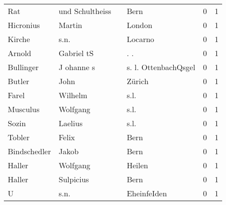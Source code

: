 \begin{center}
\begin{tiny}
\begin{longtabu}{llllrr}
                      Rat &                    und Schultheiss &             &                                        Bern &          0 &         1 \\
                Hicronius &                             Martin &             &                                      London &          0 &         1 \\
                   Kirche &                               s.n. &             &                                     Locarno &          0 &         1 \\
                   Arnold &                         Gabriel tS &             &                                        . .  &          0 &         1 \\
                Bullinger &                         J ohanne s &             &                        s. l. OttenbachQsgel &          0 &         1 \\
                   Butler &                               John &             &                                      Zürich &          0 &         1 \\
                    Farel &                            Wilhelm &             &                                        s.l. &          0 &         1 \\
                 Musculus &                           Wolfgang &             &                                        s.l. &          0 &         1 \\
                    Sozin &                            Laelius &             &                                        s.l. &          0 &         1 \\
                   Tobler &                              Felix &             &                                        Bern &          0 &         1 \\
             Bindschedler &                              Jakob &             &                                        Bern &          0 &         1 \\
                   Haller &                           Wolfgang &             &                                      Heilen &          0 &         1 \\
                   Haller &                          Sulpicius &             &                                        Bern &          0 &         1 \\
                        U &                               s.n. &             &                                 EheinfeIden &          0 &         1 \\

\end{longtabu}
\end{tiny}
\end{center}
